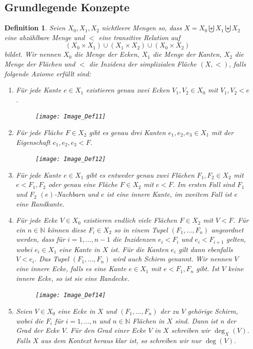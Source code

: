 \documentclass[12pt,titlepage,twoside,cleardoublepage]{article}
\theoremstyle{nummermitklammern}
\newtheorem{definition}[temp]{Definition}
\newtheorem{definition}[zahl]{Definition}
\numberwithin{equation}{section}
\begin{document}
\subsection{Grundlegende Konzepte}
\begin{definition}  \label{def1} 
Seien $X_0,X_1,X_2$ nichtleere Mengen so, dass $X=X_{0} \biguplus X_{1} \biguplus X_{2}$ eine abzählbare Menge und $<$ eine transitive Relation auf   
\[
(X_{0}\times X_{1}) \cup (X_{1}\times X_{2})\cup (X_{0}\times X_{2})
\]
 bildet.
 Wir nennen $X_{0}$ \emph{die Menge der Ecken}, $X_{1}$ \emph{die Menge der Kanten}, $X_{2}$ \emph{die Menge der Flächen} und $<$ die \emph{Inzidenz} der \emph{simplizialen Fläche} $(X,<)$, falls folgende Axiome erfüllt sind:
 \begin{enumerate}
\item Für jede Kante $e \in X_{1}$ existieren genau zwei Ecken $V_1,V_2 \in X_{0}$ mit $V_1,V_2 < e$. 
\begin{figure}[H]
\begin{center}
\texttt{[image: Image\_Def11]}
\end{center}
\end{figure}
\item Für jede Fläche $F\in X_2$ gibt es genau drei Kanten $e_1,e_2,e_3 \in X_{1}$ mit der Eigenschaft $e_1,e_2,e_3 < F$.
\begin{figure}[H]
\begin{center}
\texttt{[image: Image\_Def12]}
\end{center}
\end{figure} 
\item Für jede Kante $e \in X_{1}$ gibt es entweder genau zwei Flächen $F_{1},F_{2} \in X_{2}$ mit $e <F_{1},F_2$ oder
genau eine Fläche $F \in X_{2}$ mit $e < F$. Im ersten Fall sind $F_{1}$ und $F_{2}$ \emph{$(e)$-Nachbarn} und $e$ ist eine \emph{innere Kante}, im zweitem Fall ist $e$ eine \emph{Randkante}. 
 \item Für jede Ecke $V \in X_{0}$ existieren endlich viele Flächen $F\in X_{2}$ mit $V < F$.
  Für ein $n\in \mathbb{N}$ können diese $F_{i}\in X_2$ so in einem Tupel $(F_{1},\ldots,F_{n})$ angeordnet werden, dass für $i=1,\ldots,n-1$  die Inzidenzen $e_i<F_{i}$ und $e_i<F_{i+1}$ gelten, wobei $e_i\in X_1$ eine Kante  in $X$ ist. Für die Kanten $e_i$ gilt dann ebenfalls $V<e_i$. 
  Das Tupel $(F_1,\ldots,F_n)$ wird auch \emph{Schirm} genannt. Wir nennen $V$ eine \emph{innere Ecke}, falls es eine Kante $e\in X_1$ mit $e<F_{1},F_{n}$ gibt. Ist $V$ keine innere Ecke, so ist sie eine \emph{Randecke}.
\begin{figure}[H]
\begin{center}
\texttt{[image: Image\_Def14]}
\end{center}
\end{figure} 
 \item Seien $V \in X_0$ eine Ecke in $X$ und $(F_1,\ldots,F_n)$ der zu $V$ gehörige Schirm, wobei die $F_i$ für $i=1,\ldots ,n$ und $n\in \mathbb{N}$ Flächen in $X$ sind. Dann ist n der \emph{Grad der Ecke} $V$. Für den Grad einer Ecke $V$ in $X$ schreiben wir $\deg_X(V)$. Falls $X$ aus dem Kontext heraus klar ist, so schreiben wir nur $\deg(V)$.


\end{enumerate}
\end{definition}
\end{document}
